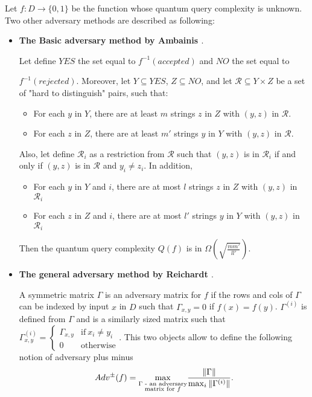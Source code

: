 Let $f:D\to\{0,1\}$ be the function whose quantum query complexity is unknown. Two other adversary methods
are described as following:
\begin{itemize}
    \item \textbf{The Basic adversary method by Ambainis \cite{andris_adversary_methode}}.
          \begin{theorem}
              Let define $YES$ the set equal to $f^{-1}(accepted)$ and $NO$ the set
              equal to

              $f^{-1}(rejected)$. Moreover, let $Y\subseteq YES$, $Z \subseteq NO$, and
              let $\mathcal{R} \subseteq Y\times Z$ be a set of "hard to distinguish" pairs, such that:
              \begin{itemize}
                  \item For each $y$ in $Y$, there are at least $m$ strings $z$ in $Z$ with $(y,z)$ in $\mathcal{R}$.
                  \item For each $z$ in $Z$, there are at least $m'$ strings $y$ in $Y$ with $(y,z)$ in $\mathcal{R}$.
              \end{itemize}
              Also, let define $\mathcal{R}_i$ as a restriction from $\mathcal{R}$ such
              that $(y, z)$ is in $\mathcal{R}_i$ if and only if $(y, z)$ is in $\mathcal{R}$
              and $y_i \neq z_i$.
              In addition,
              \begin{itemize}
                  \item For each $y$ in $Y$ and $i$, there are at most $l$ strings $z$ in $Z$ with $(y,z)$ in $\mathcal{R}_i$
                  \item For each $z$ in $Z$ and $i$, there are at most $l'$ strings $y$ in $Y$ with $(y,z)$ in $\mathcal{R}_i$
              \end{itemize}
              Then the quantum query complexity $Q(f)$ is in  $\Omega(\sqrt{\frac{m m'}{ll'}})$.
          \end{theorem}
    \item \textbf{The general adversary method by Reichardt \cite{Reichardt_2009}}.

          A symmetric matrix $\Gamma$ is an adversary matrix for $f$ if the
          rows and cols of $\Gamma$ can be indexed by input $x$ in $D$ such that
          $\Gamma_{x,y} = 0$ if $f(x) = f(y)$. $\Gamma^{(i)}$ is defined from $\Gamma$
          and is a similarly sized matrix such that $\Gamma^{(i)}_{x,y} = \left\{
              \begin{array}{ll}
                  \Gamma_{x,y} & \textrm{if} \ x_i\neq y_i \\
                  0            & \textrm{otherwise}
              \end{array}
              \right.$. This two objects allow to define the following notion of adversary plus minus
          \[Adv^{\pm}(f) = \underset{\textrm{\shortstack{$\Gamma$ -
                          an adversary\\[-1ex] matrix for $f$}}}{\max} \frac{\Vert \Gamma\Vert }{\max_i \Vert \Gamma^{(i)}\Vert}.
          \]


\end{itemize}
